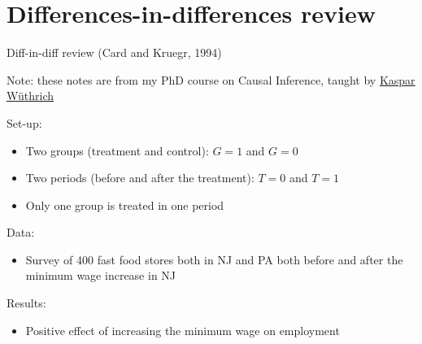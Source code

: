 \documentclass[compress, 8pt]{beamer}
\begin{document}
\section[Diff-in-diff]{Differences-in-differences review}
\miniframesoff
\begin{frame}
    \tableofcontents[currentsection]
\end{frame}
\miniframeson

\begin{frame}{Diff-in-diff review (Card and Kruegr, 1994)}

Note: these notes are from my PhD course on Causal Inference, taught by \href{https://sites.google.com/site/wuethricheconomics/home?authuser=0}{Kaspar W{\"u}thrich}

\vspace{2ex}
Set-up:
\begin{itemize}
    \item Two groups (treatment and control): $G=1$ and $G=0$
    \item Two periods (before and after the treatment): $T=0$ and $T=1$
    \item Only one group is treated in one period
\end{itemize}
Data:
\begin{itemize}
    \item Survey of 400 fast food stores both in NJ and PA both before and after the minimum wage increase in NJ
\end{itemize}
Results:
\begin{itemize}
    \item Positive effect of increasing the minimum wage on employment
\end{itemize}

\end{frame}
\end{document}

